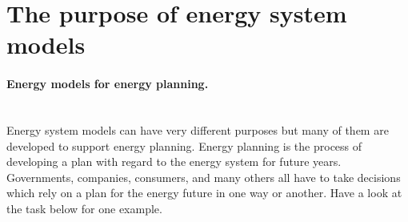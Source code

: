 
\section{The purpose of energy system models}


\paragraph{Energy models for energy planning.}~\\

Energy system models can have very different purposes but many of them are developed to support energy planning. Energy planning is the process of developing a plan with regard to the energy system for future years. Governments, companies, consumers, and many others all have to take decisions which rely on a plan for the energy future in one way or another. Have a look at the task below for one example.


